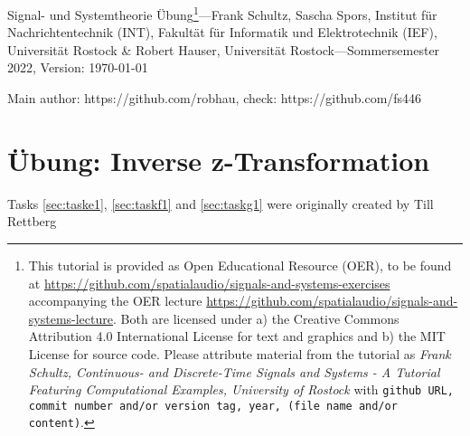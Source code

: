 \documentclass[11pt,a4paper,DIV=12]{scrartcl}
\begin{document}
%
\noindent Signal- und Systemtheorie Übung\footnote{This tutorial is provided as
Open Educational Resource (OER), to be found at
\url{https://github.com/spatialaudio/signals-and-systems-exercises}
accompanying the OER lecture
\url{https://github.com/spatialaudio/signals-and-systems-lecture}.
%
Both are licensed under a) the Creative Commons Attribution 4.0 International
License for text and graphics and b) the MIT License for source code.
%
Please attribute material from the tutorial as \textit{Frank Schultz,
Continuous- and Discrete-Time Signals and Systems - A Tutorial Featuring
Computational Examples, University of Rostock} with
\texttt{github URL, commit number and/or version tag, year, (file name and/or
content)}.}---Frank Schultz, Sascha Spors,
Institut für Nachrichtentechnik (INT),
Fakultät für Informatik und Elektrotechnik (IEF),
Universität Rostock \&
Robert Hauser, Universität Rostock---Sommersemester 2022, Version: \today

\noindent Main author: https://github.com/robhau, check: https://github.com/fs446

\tableofcontents

\section{Übung: Inverse z-Transformation}

Tasks \ref{sec:taske1}, \ref{sec:taskf1} and \ref{sec:taskg1} were originally created by Till Rettberg
\end{document}
